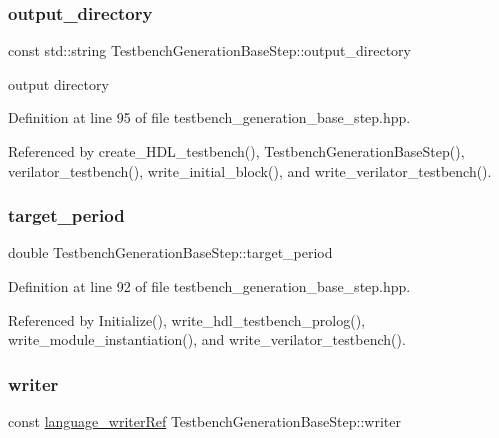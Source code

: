 \subsubsection{\texorpdfstring{output\+\_\+directory}{output\_directory}}
{\footnotesize\ttfamily const std\+::string Testbench\+Generation\+Base\+Step\+::output\+\_\+directory\hspace{0.3cm}{\ttfamily [protected]}}



output directory 



Definition at line 95 of file testbench\+\_\+generation\+\_\+base\+\_\+step.\+hpp.



Referenced by create\+\_\+\+H\+D\+L\+\_\+testbench(), Testbench\+Generation\+Base\+Step(), verilator\+\_\+testbench(), write\+\_\+initial\+\_\+block(), and write\+\_\+verilator\+\_\+testbench().

\mbox{\label{classTestbenchGenerationBaseStep_a4f6f2fe4bbfc5fdc2aaada0434a30fe8}} 
\subsubsection{\texorpdfstring{target\+\_\+period}{target\_period}}
{\footnotesize\ttfamily double Testbench\+Generation\+Base\+Step\+::target\+\_\+period\hspace{0.3cm}{\ttfamily [protected]}}



Definition at line 92 of file testbench\+\_\+generation\+\_\+base\+\_\+step.\+hpp.



Referenced by Initialize(), write\+\_\+hdl\+\_\+testbench\+\_\+prolog(), write\+\_\+module\+\_\+instantiation(), and write\+\_\+verilator\+\_\+testbench().

\mbox{\label{classTestbenchGenerationBaseStep_ad97989bb73a7115bb0f7bdffbe822401}} 
\subsubsection{\texorpdfstring{writer}{writer}}
{\footnotesize\ttfamily const \hyperlink{language__writer_8hpp_ab5bb59a651cbff3f3c83b0f51c0b0b71}{language\+\_\+writer\+Ref} Testbench\+Generation\+Base\+Step\+::writer\hspace{0.3cm}{\ttfamily [protected]}}



